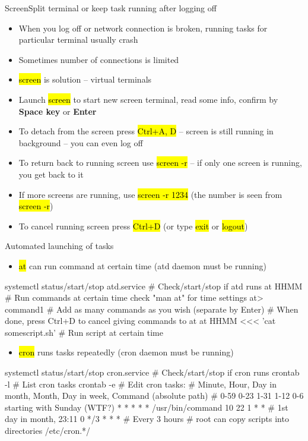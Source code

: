 \documentclass[compress, ucs, xelatex, 11pt, xcolor=svgnames,
  hyperref={
    bookmarks=true,
    unicode=true,
    colorlinks=true,
    pdftitle={Linux, command line and MetaCentrum},
    plainpages=false,
    pdfauthor={Vojtech Zeisek},
    pdfsubject={Course about use of Linux command line, writing shell scripts and using MetaCentrum of CESNET},
    pdfcreator={XeLaTeX},
    pdfkeywords={Linux, GNU, BASH, shell, command line, MetaCentrum},
    linkcolor=Red,
    anchorcolor=Blue,
    citecolor=Purple,
    filecolor=DodgerBlue,
    menucolor=DarkOrchid,
    urlcolor=DeepSkyBlue,
    pdftex},
  url={hyphens, lowtilde} %
  ]{beamer}
\renewcommand{\texttt}[1]{\hl{\ttfamily #1}}
\begin{document}
\begin{frame}{Screen}{Split terminal or keep task running after logging off}
\begin{itemize}
  \item When you log off or network connection is broken, running tasks for particular terminal usually crash
  \item Sometimes number of connections is limited
  \item \texttt{screen} is solution -- virtual terminals
  \item Launch \texttt{screen} to start new screen terminal, read some info, confirm by \textbf{Space key} or \textbf{Enter}
  \item To detach from the screen press \texttt{Ctrl+A, D} -- screen is still running in background -- you can even log off
  \item To return back to running screen use \texttt{screen -r} -- if only one screen is running, you get back to it
  \item If more screens are running, use \texttt{screen -r 1234} (the number is seen from \texttt{screen -r})
  \item To cancel running screen press \texttt{Ctrl+D} (or type \texttt{exit} or \texttt{logout})
\end{itemize}
\end{frame}

\begin{frame}[fragile]{Automated launching of tasks}
\begin{itemize}
  \item \texttt{at} can run command at certain time (atd daemon must be running)
\end{itemize}
  \begin{bashcode}
    systemctl status/start/stop atd.service # Check/start/stop if atd runs
    at HHMM # Run commands at certain time check "man at" for time settings
    at> command1 # Add as many commands as you wish (separate by Enter)
    # When done, press Ctrl+D to cancel giving commands to at
    at HHMM <<< 'cat somescript.sh' # Run script at certain time
  \end{bashcode}
\begin{itemize}
  \item \texttt{cron} runs tasks repeatedly (cron daemon must be running)
\end{itemize}
  \begin{bashcode}
    systemctl status/start/stop cron.service # Check/start/stop if cron runs
    crontab -l # List cron tasks
    crontab -e # Edit cron tasks:
    # Minute, Hour, Day in month, Month, Day in week, Command (absolute path)
    # 0-59    0-23  1-31          1-12   0-6 starting with Sunday (WTF?)
      *       *     *             *      *            /usr/bin/command
      10      22    1             *      *        # 1st day in month, 23:11
      0       */3   *             *      *        # Every 3 hours
    # root can copy scripts into directories /etc/cron.*/
  \end{bashcode}
\end{frame}
\end{document}
